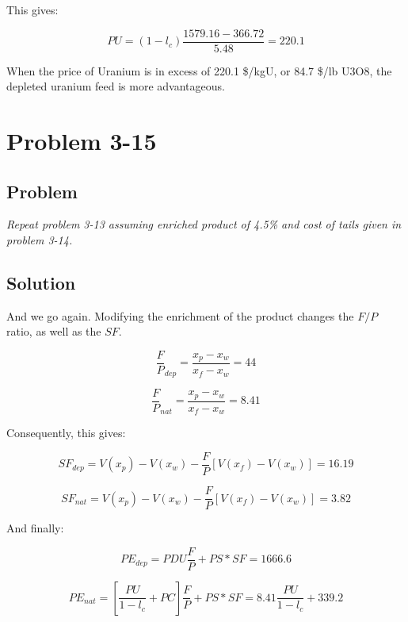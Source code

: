 This gives:

\begin{equation}
PU = (1-l_c)\frac{1579.16-366.72}{5.48} = 220.1
\end{equation}

When the price of Uranium is in excess of 220.1 \$/kgU, or 84.7 \$/lb U3O8, the depleted uranium feed is more advantageous.

\section{Problem 3-15}
\label{prob315}

\subsection{Problem}
\textit{Repeat problem 3-13 assuming enriched product of 4.5\% and cost of tails given in problem 3-14.}

\subsection{Solution}

And we go again. Modifying the enrichment of the product changes the $F/P$ ratio, as well as the $SF$.

\begin{equation}
\frac{F}{P}_{dep} = \frac{x_p - x_w}{x_f - x_w} = 44
\end{equation}


\begin{equation}
\frac{F}{P}_{nat} = \frac{x_p - x_w}{x_f - x_w} = 8.41
\end{equation}

Consequently, this gives:


\begin{equation}
SF_{dep} = V(x_p) - V(x_w) - \frac{F}{P}\left[V(x_f)-V(x_w)\right] = 16.19
\end{equation}


\begin{equation}
SF_{nat} = V(x_p) - V(x_w) - \frac{F}{P}\left[V(x_f)-V(x_w)\right] = 3.82
\end{equation}

And finally:


\begin{equation}
PE_{dep} = PDU\frac{F}{P} + PS*SF = 1666.6
\end{equation}

\begin{equation}
PE_{nat} = \left[\frac{PU}{1-l_c} + PC\right]\frac{F}{P} + PS*SF = 8.41\frac{PU}{1-l_c} + 339.2
\end{equation}

